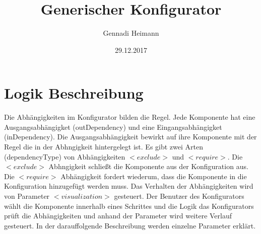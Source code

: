 \documentclass{article}
\begin{document}
\begin{titlepage}

\author{Gennadi Heimann} 
\title{Generischer Konfigurator} 
\date{29.12.2017} 
\maketitle
\end{titlepage}

\section{Logik Beschreibung}

Die Abhängigkeiten im Konfigurator bilden die Regel. Jede Komponente hat eine
Ausgangsabhängigket (outDependency) und eine Eingangsabhängigket
(inDependency). Die Ausgangsabhängigkeit bewirkt auf ihre Komponente mit der
Regel die in der Abhngigkeit hintergelegt ist. 
Es gibt zwei Arten (dependencyType) von Abhängigkeiten $<exclude>$ und
$<require>$. Die $<exclude>$ Abhngigkeit schlie\ss{}t die Komponente aus der
Konfiguration aus. Die $<require>$ Abhängigkeit fordert wiederum, dass die
Komponente in die Konfiguration hinzugefügt werden muss. Das Verhalten der
Abhängigkeiten wird von Parameter $<visualization>$ gesteuert. Der Benutzer
des Konfigurators wählt die Komponente innerhalb eines Schrittes und die
Logik das Konfigurators prüft die Abhängigkeiten und anhand der Parameter
wird weitere Verlauf gesteuert. In der darauffolgende Beschreibung werden
einzelne Parameter erklärt.
\end{document}
